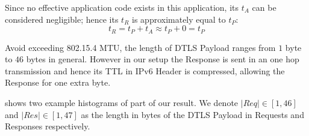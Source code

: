  

Since no effective application code exists in this application, its $t_A$ can be considered negligible; hence its $t_R$ is approximately equal to $t_P$:
\begin{equation}
t_R = t_P + t_A \approx t_P + 0 = t_P
\end{equation}

Avoid exceeding 802.15.4 MTU, the length of DTLS Payload ranges from $1$ byte to $46$ bytes in general. However in our setup the Response is sent in an one hop transmission and hence its TTL in IPv6 Header is compressed, allowing the Response for one extra byte.

 shows two example histograms of part of our result. We denote $|Req| \in [1,46]$ and $|Res| \in [1,47]$ as the length in bytes of the DTLS Payload in Requests and Responses respectively.

